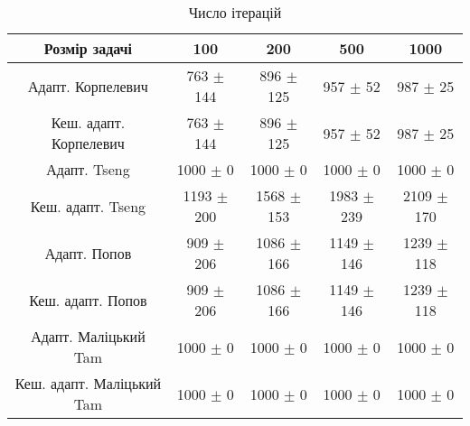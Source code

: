 \begin{table}[H]
	\centering
	\begin{tabular}{|c||c|c|c|c|}\hline
		Розмір задачі & 100 & 200 & 500 & 1000 \\ \hline \hline
		Адапт. Корпелевич & 763 $\pm$ 144 & 896 $\pm$ 125 & 957 $\pm$ 52 & 987 $\pm$ 25 \\ \hline
		Кеш. адапт. Корпелевич & 763 $\pm$ 144 & 896 $\pm$ 125 & 957 $\pm$ 52 & 987 $\pm$ 25 \\ \hline
		Адапт. Tseng & 1000 $\pm$ 0 & 1000 $\pm$ 0 & 1000 $\pm$ 0 & 1000 $\pm$ 0 \\ \hline
		Кеш. адапт. Tseng & 1193 $\pm$ 200 & 1568 $\pm$ 153 & 1983 $\pm$ 239 & 2109 $\pm$ 170 \\ \hline
		Адапт. Попов & 909 $\pm$ 206 & 1086 $\pm$ 166 & 1149 $\pm$ 146 & 1239 $\pm$ 118 \\ \hline
		Кеш. адапт. Попов & 909 $\pm$ 206 & 1086 $\pm$ 166 & 1149 $\pm$ 146 & 1239 $\pm$ 118 \\ \hline
		Адапт. Маліцький Tam & 1000 $\pm$ 0 & 1000 $\pm$ 0 & 1000 $\pm$ 0 & 1000 $\pm$ 0 \\ \hline
		Кеш. адапт. Маліцький Tam & 1000 $\pm$ 0 & 1000 $\pm$ 0 & 1000 $\pm$ 0 & 1000 $\pm$ 0 \\ \hline
	\end{tabular}
	\caption{Число ітерацій}
\end{table}
